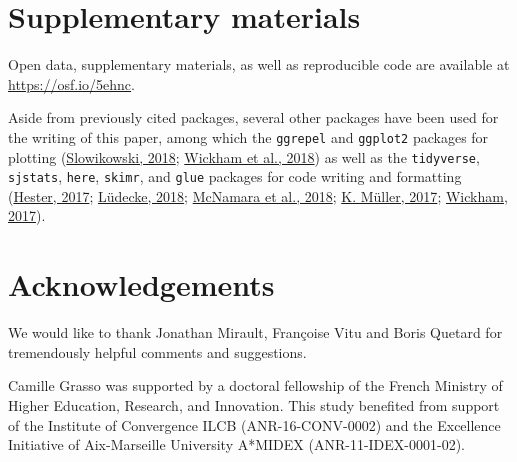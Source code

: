\documentclass[
  a4paper,12pt,twoside,onecolumn,openright,final,oldfontcommands]{memoir}
\begin{document}
\hypertarget{suppCh4}{%
\section{Supplementary materials}\label{suppCh4}}

Open data, supplementary materials, as well as reproducible code are available at \url{https://osf.io/5ehnc}.

Aside from previously cited packages, several other packages have been used for the writing of this paper, among which the \texttt{ggrepel} and \texttt{ggplot2} packages for plotting (\protect\hyperlink{ref-R-ggrepel}{Slowikowski, 2018}; \protect\hyperlink{ref-R-ggplot2}{Wickham et al., 2018}) as well as the \texttt{tidyverse}, \texttt{sjstats}, \texttt{here}, \texttt{skimr}, and \texttt{glue} packages for code writing and formatting (\protect\hyperlink{ref-R-glue}{Hester, 2017}; \protect\hyperlink{ref-R-sjstats}{Lüdecke, 2018}; \protect\hyperlink{ref-R-skimr}{McNamara et al., 2018}; \protect\hyperlink{ref-R-here}{K. Müller, 2017}; \protect\hyperlink{ref-R-tidyverse}{Wickham, 2017}).

\hypertarget{acknowledgements-1}{%
\section{Acknowledgements}\label{acknowledgements-1}}

We would like to thank Jonathan Mirault, Françoise Vitu and Boris Quetard for tremendously helpful comments and suggestions.

Camille Grasso was supported by a doctoral fellowship of the French Ministry of Higher Education, Research, and Innovation. This study benefited from support of the Institute of Convergence ILCB (ANR-16-CONV-0002) and the Excellence Initiative of Aix-Marseille University A*MIDEX (ANR-11-IDEX-0001-02).

\newpage
\end{document}
